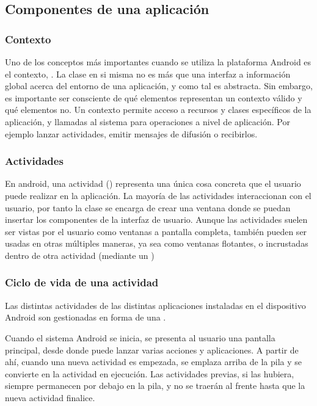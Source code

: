 \subsection{Componentes de una aplicación}

\subsubsection{Contexto}
    Uno de los conceptos más importantes cuando se utiliza la plataforma Android es el contexto, . La clase  en si misma no es más que una interfaz a información global acerca del entorno de una aplicación, y como tal es abstracta. Sin embargo, es importante ser consciente de qué elementos representan un contexto válido y qué elementos no. Un contexto permite acceso a recursos y clases específicos de la aplicación, y llamadas al sistema para operaciones a nivel de aplicación. Por ejemplo lanzar actividades, emitir mensajes de difusión o recibirlos.

\subsubsection{Actividades}
    En android, una actividad () representa una única cosa concreta que el usuario puede realizar en la aplicación. La mayoría de las actividades interaccionan con el usuario, por tanto la clase  se encarga de crear una ventana donde se puedan insertar los componentes de la interfaz de usuario. Aunque las actividades suelen ser vistas por el usuario como ventanas a pantalla completa, también pueden ser usadas en otras múltiples maneras, ya sea como ventanas flotantes, o incrustadas dentro de otra actividad (mediante un )

\subsubsection{Ciclo de vida de una actividad}
    Las distintas actividades de las distintas aplicaciones instaladas en el dispositivo Android son gestionadas en forma de una .
 
    Cuando el sistema Android se inicia, se presenta al usuario una pantalla principal, desde donde puede lanzar varias acciones y aplicaciones. A partir de ahí, cuando una nueva actividad es empezada, se emplaza arriba de la pila y se convierte en la actividad en ejecución. Las actividades previas, si las hubiera, siempre permanecen por debajo en la pila, y no se traerán al frente hasta que la nueva actividad finalice.

